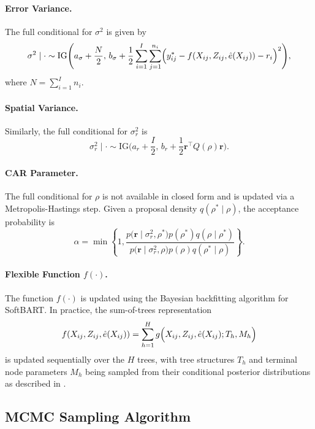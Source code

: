 \documentclass[useAMS,referee]{biom}
\begin{document}
\paragraph{Error Variance.} The full conditional for $\sigma^2$ is given by
\begin{equation} \label{eq:sigma2}
\sigma^2 \mid \cdot \sim \text{IG}\Biggl(a_\sigma+\frac{N}{2},\,b_\sigma+\frac{1}{2}\sum_{i=1}^{I}\sum_{j=1}^{n_i}\Bigl(y_{ij}^\ast-f(X_{ij},Z_{ij},\hat{e}(X_{ij}))-r_i\Bigr)^2\Biggr),
\end{equation}
where $N=\sum_{i=1}^{I}n_i$.

\paragraph{Spatial Variance.} Similarly, the full conditional for $\sigma_r^2$ is
\begin{equation} \label{eq:sigmar2}
\sigma_r^2 \mid \cdot \sim \text{IG}\Biggl(a_r+\frac{I}{2},\,b_r+\frac{1}{2}\bm{r}^\top Q(\rho)\bm{r}\Biggr).
\end{equation}

\paragraph{CAR Parameter.} The full conditional for $\rho$ is not available in closed form and is updated via a Metropolis-Hastings step. Given a proposal density $q(\rho^\ast\mid\rho)$, the acceptance probability is
\[
\alpha=\min\left\{1,\frac{p\bigl(\bm{r}\mid\sigma_r^2,\rho^\ast\bigr)p(\rho^\ast)q(\rho\mid\rho^\ast)}{p\bigl(\bm{r}\mid\sigma_r^2,\rho\bigr)p(\rho)q(\rho^\ast\mid\rho)}\right\}.
\]

\paragraph{Flexible Function $f(\cdot)$.} The function $f(\cdot)$ is updated using the Bayesian backfitting algorithm for SoftBART. In practice, the sum-of-trees representation
\[
f(X_{ij},Z_{ij},\hat{e}(X_{ij})) = \sum_{h=1}^H g\Bigl(X_{ij},Z_{ij},\hat{e}(X_{ij});T_h,M_h\Bigr)
\]
is updated sequentially over the $H$ trees, with tree structures $T_h$ and terminal node parameters $M_h$ being sampled from their conditional posterior distributions as described in \cite{chipman2010bart}.

\subsection{MCMC Sampling Algorithm}
\end{document}
